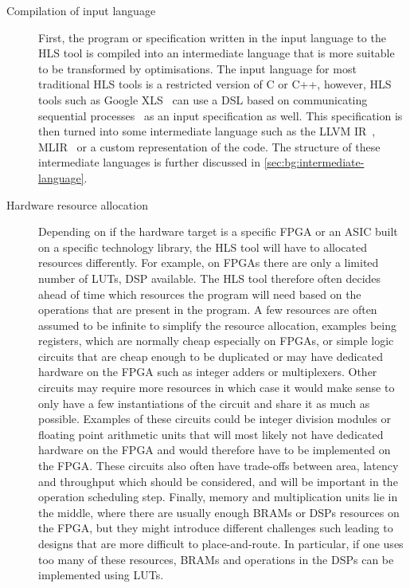 \begin{description}
\item[Compilation of input language] First, the program or specification written
  in the input language to the \gls{HLS} tool is compiled into an intermediate
  language that is more suitable to be transformed by optimisations.  The input
  language for most traditional \gls{HLS} tools is a restricted version of C or
  C++, however, \gls{HLS} tools such as Google XLS~\cite{google23_xls} can use a
  \gls{DSL} based on communicating sequential
  processes~\cite{hoare78_commun_sequen_proces} as an input specification as
  well.  This specification is then turned into some intermediate language such
  as the LLVM \gls{IR}~\cite{lattner04_llvm}, MLIR~\cite{lattner21_mlir} or a
  custom representation of the code.  The structure of these intermediate
  languages is further discussed in \cref{sec:bg:intermediate-language}.

\item[Hardware resource allocation] Depending on if the hardware target is a
  specific \gls{FPGA} or an \gls{ASIC} built on a specific technology library,
  the \gls{HLS} tool will have to allocated resources differently.  For example,
  on \glspl{FPGA} there are only a limited number of \glspl{LUT}, \gls{DSP}
  available.  The \gls{HLS} tool therefore often decides ahead of time which
  resources the program will need based on the operations that are present in
  the program.  A few resources are often assumed to be infinite to simplify the
  resource allocation, examples being registers, which are normally cheap
  especially on \glspl{FPGA}, or simple logic circuits that are cheap enough to
  be duplicated or may have dedicated hardware on the FPGA such as integer
  adders or multiplexers.  Other circuits may require more resources in which
  case it would make sense to only have a few instantiations of the circuit and
  share it as much as possible.  Examples of these circuits could be integer
  division modules or floating point arithmetic units that will most likely not
  have dedicated hardware on the \gls{FPGA} and would therefore have to be
  implemented on the \gls{FPGA}.  These circuits also often have trade-offs
  between area, latency and throughput which should be considered, and will be
  important in the operation scheduling step.  Finally, memory and
  multiplication units lie in the middle, where there are usually enough
  \glspl{BRAM} or \glspl{DSP} resources on the \gls{FPGA}, but they might
  introduce different challenges such leading to designs that are more difficult
  to place-and-route.  In particular, if one uses too many of these resources,
  \glspl{BRAM} and operations in the \glspl{DSP} can be implemented using
  \glspl{LUT}.


\end{description}
